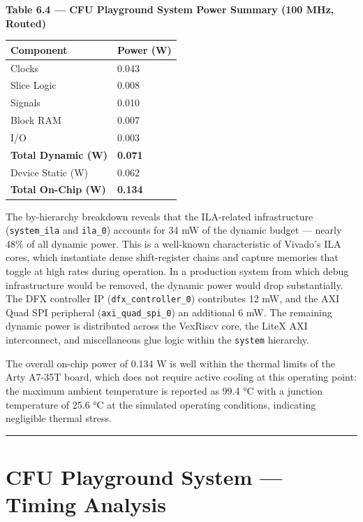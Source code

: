 \textbf{Table 6.4 — CFU Playground System Power Summary (100 MHz, Routed)}

\begin{table}[htbp]
\centering
\begin{tabularx}{\textwidth}{X X}
\toprule
Component & Power (W) \\
\midrule
Clocks & 0.043 \\
Slice Logic & 0.008 \\
Signals & 0.010 \\
Block RAM & 0.007 \\
I/O & 0.003 \\
\textbf{Total Dynamic (W)} & \textbf{0.071} \\
Device Static (W) & 0.062 \\
\textbf{Total On-Chip (W)} & \textbf{0.134} \\
\bottomrule
\end{tabularx}
\end{table}

The by-hierarchy breakdown reveals that the ILA-related infrastructure (\texttt{system\_ila} and \texttt{ila\_0}) accounts for 34 mW of the dynamic budget — nearly 48\% of all dynamic power. This is a well-known characteristic of Vivado's ILA cores, which instantiate dense shift-register chains and capture memories that toggle at high rates during operation. In a production system from which debug infrastructure would be removed, the dynamic power would drop substantially. The DFX controller IP (\texttt{dfx\_controller\_0}) contributes 12 mW, and the AXI Quad SPI peripheral (\texttt{axi\_quad\_spi\_0}) an additional 6 mW. The remaining dynamic power is distributed across the VexRiscv core, the LiteX AXI interconnect, and miscellaneous glue logic within the \texttt{system} hierarchy.

The overall on-chip power of 0.134 W is well within the thermal limits of the Arty A7-35T board, which does not require active cooling at this operating point: the maximum ambient temperature is reported as 99.4 °C with a junction temperature of 25.6 °C at the simulated operating conditions, indicating negligible thermal stress.

\vspace{0.4em}\hrule\vspace{0.4em}

\section{CFU Playground System — Timing Analysis}

